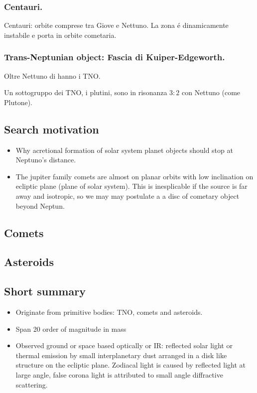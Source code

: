 \subsubsection{Centauri.}

Centauri: orbite comprese tra Giove e Nettuno. La zona \'e dinamicamente instabile e porta in orbite cometaria.

\subsubsection{Trans-Neptunian object: Fascia di Kuiper-Edgeworth.}

Oltre Nettuno di hanno i TNO.

Un sottogruppo dei TNO, i plutini, sono in risonanza $3:2$ con Nettuno (come Plutone).

\subsection{Search motivation}

\begin{itemize}
\item Why acretional formation of solar system planet objects should stop at Neptuno's distance.
\item The jupiter family comets are almost on planar orbits with low inclination on ecliptic plane (plane of solar system). This is inesplicable if the source is far away and isotropic, so we may may postulate a a disc of cometary object beyond Neptun.
\end{itemize}

\subsection{Comets}

\subsection{Asteroids}

\subsection{Short summary}
\begin{itemize}
\item Originate from primitive bodies: TNO, comets and asteroids.
\item Span 20 order of magnitude in mass
\item Observed ground or space based optically or IR: reflected solar light or thermal emission by small interplanetary dust arranged in a disk like structure on the ecliptic plane.
Zodiacal light is caused by reflected light at large angle, false corona light is attributed to small angle diffractive scattering.
\end{itemize}



